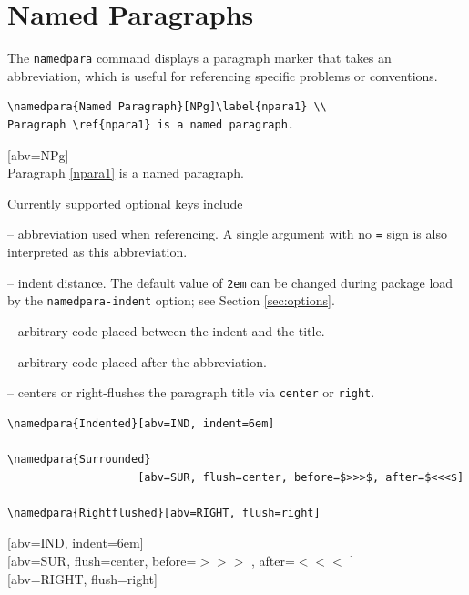 \documentclass{article}
\begin{document}
\section{Named Paragraphs}\label{sec:paragraphs}
The \verb|namedpara| command displays a paragraph marker that takes an abbreviation, which is useful for referencing specific problems or conventions.
\begin{tcolorbox}
  \begin{Verbatim}
\namedpara{Named Paragraph}[NPg]\label{npara1} \\
Paragraph \ref{npara1} is a named paragraph.
  \end{Verbatim}
\tcblower
{}[abv=NPg]\label{npara1} \\
Paragraph \ref{npara1} is a named paragraph.
\end{tcolorbox}

Currently supported optional keys include\Vtrg
	\begin{compactitem}
	\item[\Verb|abv|] -- abbreviation used when referencing. A single argument with no \Verb|=| sign is also interpreted as this abbreviation.
	\item[\Verb|indent|] -- indent distance. The default value of \verb|2em| can be changed during package load by the \verb|namedpara-indent| option; see Section \ref{sec:options}.
	\item[\Verb|before|] -- arbitrary code placed between the indent and the title.
	\item[\Verb|after|] -- arbitrary code placed after the abbreviation.
	\item[\Verb|flush|] -- centers or right-flushes the paragraph title via \verb|center| or \verb|right|.
	\end{compactitem}

\begin{tcolorbox}
  \begin{Verbatim}
\namedpara{Indented}[abv=IND, indent=6em]

\namedpara{Surrounded}
					[abv=SUR, flush=center, before=$>>>$, after=$<<<$]

\namedpara{Rightflushed}[abv=RIGHT, flush=right]
  \end{Verbatim}
\tcblower
{}[abv=IND, indent=6em] \\
[abv=SUR, flush=center, before=$>>>$ , after=$<<<$ ] \\
[abv=RIGHT, flush=right]
\end{tcolorbox}
\end{document}
